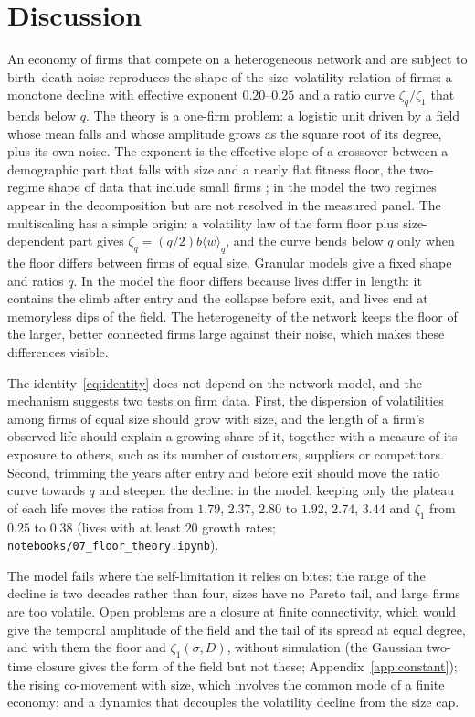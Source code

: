 \documentclass[pre,twocolumn,superscriptaddress,nofootinbib]{revtex4-2}
\begin{document}
\section{Discussion}
\label{sec:discussion}

An economy of firms that compete on a heterogeneous network and are subject to birth--death noise
reproduces the shape of the size--volatility relation of firms: a monotone decline with effective
exponent $0.20$--$0.25$ and a ratio curve $\zeta_q/\zeta_1$ that bends below $q$.  The theory is a one-firm problem:
a logistic unit driven by a field whose mean falls and whose amplitude grows as the square root of its
degree, plus its own noise.  The exponent is the effective slope of a crossover between a demographic part
that falls with size and a nearly flat fitness floor, the two-regime shape of data that include small
firms \cite{fontanelli2025}; in the model the two regimes appear in the decomposition but are not
resolved in the measured panel.  The multiscaling has a simple origin: a volatility law of the form
floor plus size-dependent part gives $\zeta_q=(q/2)b\langle w\rangle_q$, and the curve bends below $q$ only
when the floor differs between firms of equal size.  Granular models give a fixed shape and ratios
$q$.  In the model the floor differs because lives differ in length: it contains the climb after entry and
the collapse before exit, and lives end at memoryless dips of the field.  The heterogeneity of the network
keeps the floor of the larger, better connected firms large against their noise, which makes these
differences visible.

The identity~\eqref{eq:identity} does not depend on the network model, and the mechanism suggests two
tests on firm data.  First, the dispersion of volatilities among firms of equal size should grow with
size, and the length of a firm's observed life should explain a growing share of it, together with a
measure of its exposure to others, such as its number of customers, suppliers or competitors.  Second,
trimming the years after entry and before exit should move the ratio curve towards $q$ and steepen the
decline: in the model, keeping only the plateau of each life moves the ratios from $1.79$, $2.37$, $2.80$ to
$1.92$, $2.74$, $3.44$ and $\zeta_1$ from $0.25$ to $0.38$ (lives with at least $20$ growth rates;
\texttt{notebooks/07\_floor\_theory.ipynb}).

The model fails where the self-limitation it relies on bites: the range of the decline is two decades
rather than four, sizes have no Pareto tail, and large firms are too volatile.  Open problems are a
closure at finite connectivity, which would give the temporal amplitude of the field and the tail of
its spread at equal degree, and with them the floor and $\zeta_1(\sigma,D)$, without simulation (the
Gaussian two-time closure gives the form of the field but not these; Appendix~\ref{app:constant}); the
rising co-movement with size, which involves the common mode of a finite economy; and a dynamics that
decouples the volatility decline from the size cap.
\end{document}
